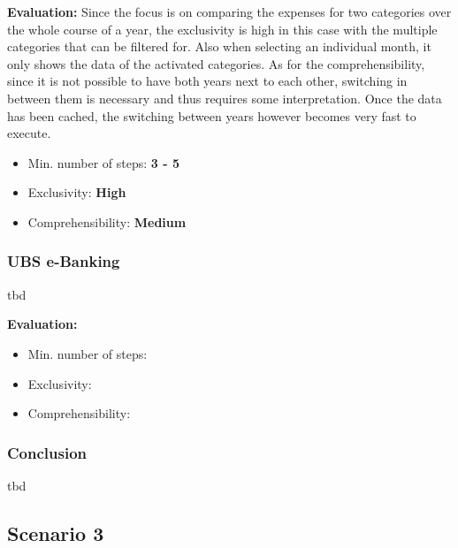 \textbf{Evaluation:} Since the focus is on comparing the expenses for two categories over the whole course of a year, the exclusivity is high in this case with the multiple categories that can be filtered for. Also when selecting an individual month, it only shows the data of the activated categories. As for the comprehensibility, since it is not possible to have both years next to each other, switching in between them is necessary and thus requires some interpretation. Once the data has been cached, the switching between years however becomes very fast to execute.
\begin{itemize}[noitemsep,nolistsep]
	\item Min. number of steps: \textbf{3 - 5}
	\item Exclusivity: \textbf{High}
	\item Comprehensibility: \textbf{Medium}
\end{itemize}



\subsubsection{UBS e-Banking}

tbd

\textbf{Evaluation:} 
\begin{itemize}[noitemsep,nolistsep]
	\item Min. number of steps: \textbf{}
	\item Exclusivity: \textbf{}
	\item Comprehensibility: \textbf{}
\end{itemize}


\subsubsection{Conclusion}

tbd





\subsection{Scenario 3}

